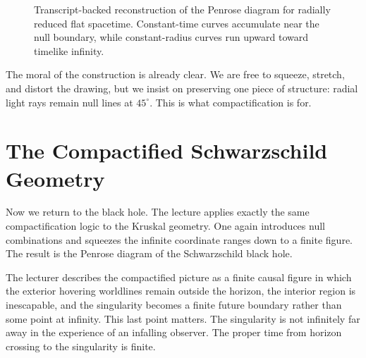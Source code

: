 \begin{figure}[htbp]
\centering
{}
\caption{Transcript-backed reconstruction of the Penrose diagram for radially reduced flat spacetime. Constant-time curves accumulate near the null boundary, while constant-radius curves run upward toward timelike infinity.}
\end{figure}

The moral of the construction is already clear. We are free to squeeze, stretch, and distort the drawing, but we insist on preserving one piece of structure: radial light rays remain null lines at \(45^\circ\). This is what compactification is for.

\section{The Compactified Schwarzschild Geometry}

Now we return to the black hole. The lecture applies exactly the same compactification logic to the Kruskal geometry. One again introduces null combinations and squeezes the infinite coordinate ranges down to a finite figure. The result is the Penrose diagram of the Schwarzschild black hole.

The lecturer describes the compactified picture as a finite causal figure in which the exterior hovering worldlines remain outside the horizon, the interior region is inescapable, and the singularity becomes a finite future boundary rather than some point at infinity. This last point matters. The singularity is not infinitely far away in the experience of an infalling observer. The proper time from horizon crossing to the singularity is finite.


